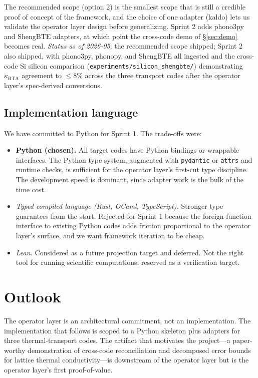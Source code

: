 \documentclass[11pt,a4paper]{article}
\begin{document}
The recommended scope (option 2) is the smallest scope that is still a credible proof of concept
of the framework, and the choice of one adapter (kaldo) lets us validate the operator layer design
before generalizing. Sprint 2 adds phono3py and ShengBTE adapters, at which point the cross-code
demo of \S\ref{sec:demo} becomes real. \emph{Status as of 2026-05}: the
recommended scope shipped; Sprint 2 also shipped, with phono3py, phonopy,
and ShengBTE all ingested and the cross-code Si silicon comparison
(\texttt{experiments/silicon\_shengbte/}) demonstrating $\kappa_\text{RTA}$
agreement to $\le 8\%$ across the three transport codes after the operator
layer's spec-derived conversions.

\subsection{Implementation language}

We have committed to Python for Sprint 1. The trade-offs were:

\begin{itemize}[leftmargin=2em]
  \item \textbf{Python (chosen).} All target codes have Python bindings or wrappable interfaces.
        The Python type system, augmented with \texttt{pydantic} or \texttt{attrs} and runtime
        checks, is sufficient for the operator layer's first-cut type discipline. The development
        speed is dominant, since adapter work is the bulk of the time cost.
  \item \emph{Typed compiled language (Rust, OCaml, TypeScript).} Stronger type guarantees from
        the start. Rejected for Sprint 1 because the foreign-function interface to existing
        Python codes adds friction proportional to the operator layer's surface, and we want
        framework iteration to be cheap.
  \item \emph{Lean.} Considered as a future projection target and deferred. Not the right tool for
        running scientific computations; reserved as a verification target.
\end{itemize}

\section{Outlook}
\label{sec:outlook}

The operator layer is an architectural commitment, not an implementation. The implementation that
follows is scoped to a Python skeleton plus adapters for three thermal-transport codes. The
artifact that motivates the project---a paper-worthy demonstration of cross-code reconciliation
and decomposed error bounds for lattice thermal conductivity---is downstream of the operator layer but
is the operator layer's first proof-of-value.
\end{document}
